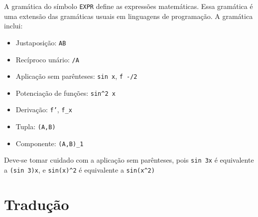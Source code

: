 \documentclass[10pt,a4paper]{article}
\begin{document}
A gramática do símbolo \texttt{EXPR} define as expressões matemáticas.
Essa gramática é uma extensão das gramáticas usuais em linguagens de programação. A gramática inclui:

\begin{itemize}
\item Justaposição: \texttt{AB}
\item Recíproco unário: \texttt{/A}
\item Aplicação sem parênteses: \texttt{sin x}, \texttt{f -/2}
\item Potenciação de funções: \texttt{sin\textasciicircum 2 x}
\item Derivação: \texttt{f'}, \texttt{f\_x}
\item Tupla: \texttt{(A,B)}
\item Componente: \texttt{(A,B)\_1}
\end{itemize}

Deve-se tomar cuidado com a aplicação sem parênteses, pois \texttt{sin 3x} é equivalente a
\texttt{(sin 3)x}, e \texttt{sin(x)\textasciicircum 2} é equivalente a \texttt{sin(x\textasciicircum 2)}

\section{Tradução}
\end{document}
